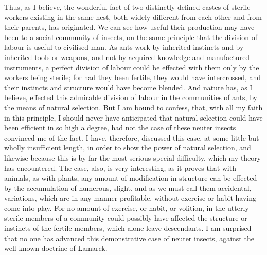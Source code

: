 Thus, as I believe, the wonderful fact of two distinctly defined castes of sterile workers existing in the same nest, both widely different from each other and from their parents, has originated. We can see how useful their production may have been to a social community of insects, on the same principle that the division of labour is useful to civilised man. As ants work by inherited instincts and by inherited tools or weapons, and not by acquired knowledge and manufactured instruments, a perfect division of labour could be effected with them only by the workers being sterile; for had they been fertile, they would have intercrossed, and their instincts and structure would have become blended. And nature has, as I believe, effected this admirable division of labour in the communities of ants, by the means of natural selection. But I am bound to confess, that, with all my faith in this principle, I should never have anticipated that natural selection could have been efficient in so high a degree, had not the case of these neuter insects convinced me of the fact. I have, therefore, discussed this case, at some little but wholly insufficient length, in order to show the power of natural selection, and likewise because this is by far the most serious special difficulty, which my theory has encountered. The case, also, is very interesting, as it proves that with animals, as with plants, any amount of modification in structure can be effected by the accumulation of numerous, slight, and as we must call them accidental, variations, which are in any manner profitable, without exercise or habit having come into play. For no amount of exercise, or habit, or volition, in the utterly sterile members of a community could possibly have affected the structure or instincts of the fertile members, which alone leave descendants. I am surprised that no one has advanced this demonstrative case of neuter insects, against the well-known doctrine of Lamarck.

